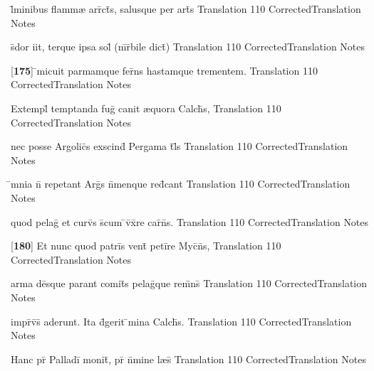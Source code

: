 \latline
  {l\={}minibus flamm{\ae} arr\={}ct\={\macron {\i}}s, salusque per art\={}s}
  { Translation }
  {110}
  { CorrectedTranslation }
  { Notes }


\latline
  {s\={}dor iit, terque ipsa sol\={} (m\={\macron {\i}}r\={}bile dict\={})}
  { Translation }
  {110}
  { CorrectedTranslation }
  { Notes }


\latline
  {[\textbf{175}] \={}micuit parmamque fer\={}ns hastamque trementem.}
  { Translation }
  {110}
  { CorrectedTranslation }
  { Notes }


\latline
  {Extempl\={} temptanda fug\={} canit {\ae}quora Calch\={}s,}
  { Translation }
  {110}
  { CorrectedTranslation }
  { Notes }


\latline
  {nec posse Argolic\={\macron {\i}}s exscind\={\macron {\i}} Pergama t\={}l\={\macron {\i}}s}
  { Translation }
  {110}
  { CorrectedTranslation }
  { Notes }


\latline
  {\={}mnia n\={\macron {\i}} repetant Arg\={\macron {\i}}s n\={}menque red\={}cant}
  { Translation }
  {110}
  { CorrectedTranslation }
  { Notes }


\latline
  {quod pelag\={} et curv\={\macron {\i}}s s\={}cum \={}v\={}x\={}re car\={\macron {\i}}n\={\macron {\i}}s.}
  { Translation }
  {110}
  { CorrectedTranslation }
  { Notes }


\latline
  {[\textbf{180}] Et nunc quod patri\={}s vent\={} peti\={}re Myc\={}n\={}s,}
  { Translation }
  {110}
  { CorrectedTranslation }
  { Notes }


\latline
  {arma de\={}sque parant comit\={}s pelag\={}que rem\={}ns\={}}
  { Translation }
  {110}
  { CorrectedTranslation }
  { Notes }


\latline
  {impr\={}v\={\macron {\i}}s\={\macron {\i}} aderunt.  Ita d\={\macron {\i}}gerit \={}mina Calch\={}s.}
  { Translation }
  {110}
  { CorrectedTranslation }
  { Notes }


\latline
  {Hanc pr\={} Palladi\={} monit\={\macron {\i}}, pr\={} n\={}mine l{\ae}s\={}}
  { Translation }
  {110}
  { CorrectedTranslation }
  { Notes }


